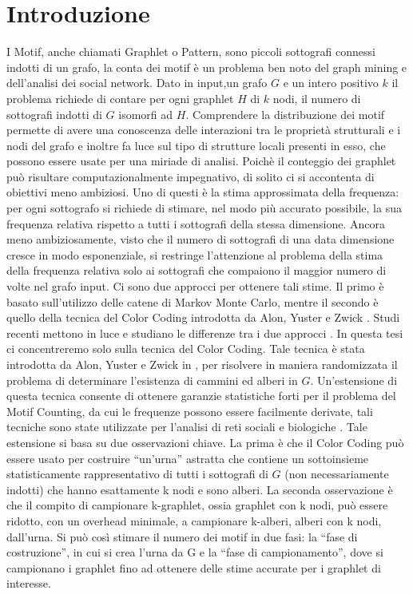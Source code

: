 \chapter{Introduzione}

I Motif, anche chiamati Graphlet o Pattern, sono piccoli sottografi connessi indotti di un grafo, la conta dei motif \`e un problema ben noto del graph mining e dell'analisi dei social network.
Dato in input,un grafo $G$ e un intero positivo $k$ il problema richiede di contare per ogni graphlet $H$ di $k$ nodi, il numero di sottografi indotti di $G$ isomorfi ad $H$.
Comprendere la distribuzione dei motif permette di avere una  conoscenza delle interazioni tra le propriet\`a strutturali e i nodi del grafo e inoltre fa luce sul tipo di strutture locali presenti in esso, che possono essere usate per una miriade di analisi.
Poich\`e il conteggio dei graphlet pu\`o risultare computazionalmente impegnativo, di solito ci si accontenta di obiettivi meno ambiziosi.
Uno di questi \`e la stima approssimata della frequenza: per ogni sottografo si richiede di stimare, nel modo pi\`u accurato possibile, la sua frequenza relativa rispetto a tutti i sottografi della stessa dimensione.
Ancora meno ambiziosamente, visto che il numero di sottografi di una data dimensione cresce in modo esponenziale, si restringe l'attenzione al problema della stima della frequenza relativa solo ai sottografi che compaiono il maggior numero di volte nel grafo input.
Ci sono due approcci per ottenere tali stime.
Il primo \`e basato sull'utilizzo delle catene di Markov Monte Carlo, mentre il secondo \`e quello della tecnica del Color Coding introdotta da Alon, Yuster e Zwick \cite{alon1995color}.
Studi recenti mettono in luce e studiano le differenze tra i due approcci \cite{bressan2018motif}.
In questa tesi ci concentreremo solo sulla tecnica del Color Coding.
Tale tecnica \`e stata introdotta da Alon, Yuster e Zwick in \cite{alon1995color}, per risolvere in maniera randomizzata il problema di determinare l'esistenza di cammini ed alberi in $G$.
Un'estensione di questa tecnica consente di ottenere garanzie statistiche forti per il problema del Motif Counting, da cui le frequenze possono essere facilmente derivate, tali tecniche sono state utilizzate per l'analisi di reti sociali e biologiche \cite{bressan2018motif,bressan2019motivo,alon2008biomolecular}.
Tale estensione si basa su due osservazioni chiave.
La prima \`e che il Color Coding pu\`o essere usato per costruire ``un'urna'' astratta che contiene un sottoinsieme statisticamente rappresentativo di tutti i sottografi di $G$ (non necessariamente indotti) che hanno esattamente k nodi e sono alberi.
La seconda osservazione \`e che il compito di campionare k-graphlet, ossia graphlet con k nodi, pu\`o essere ridotto, con un overhead minimale, a campionare k-alberi, alberi con k nodi, dall'urna.
Si pu\`o cos\`i stimare il numero dei motif in due fasi: la ``fase di costruzione'', in cui si crea l'urna da G e la ``fase di campionamento'', dove si campionano i graphlet fino ad ottenere delle stime accurate per i graphlet di interesse.


